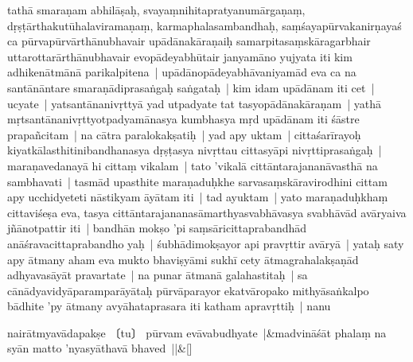 \documentclass[article,a4paper]{memoir}
\begin{document}
	  \pstart tathā\- smaraṇam abhilā\-ṣaḥ, svayaṃnihitapratyanumā\-rgaṇaṃ, dṛṣṭā\-rthakutū\-halaviramaṇaṃ, karmaphalasambandhaḥ, saṃśayapū\-rvakanirṇayaś ca pū\-rvapū\-rvā\-rthā\-nubhavair upā\-dā\-nakā\-raṇaiḥ samarpitasaṃskā\-ragarbhair uttarottarā\-rthā\-nubhavair evopā\-deyabhū\-tair janyamā\-no yujyata iti kim adhikenā\-tmā\-nā\- parikalpitena | \label{thakur75-127.13} upā\-dā\-nopā\-deyabhā\-vaniyamā\-d eva ca na santā\-nā\-ntare smaraṇā\-diprasaṅgaḥ saṅgataḥ | kim idam upā\-dā\-nam iti cet | \label{thakur75-127.14} ucyate | yatsantā\-nanivṛttyā\- yad utpadyate tat tasyopā\-dā\-nakā\-raṇam | yathā\- mṛtsantā\-nanivṛttyotpadyamā\-nasya kumbhasya mṛd upā\-dā\-nam iti śā\-stre prapañcitam | na cā\-tra paralokakṣatiḥ | \label{thakur75-127.17} yad apy uktam | cittaśarī\-rayoḥ kiyatkā\-lasthitinibandhanasya dṛṣṭasya nivṛttau cittasyā\-pi nivṛttiprasaṅgaḥ | maraṇavedanayā\- hi cittaṃ vikalam | tato 'vikalā\- cittā\-ntarajananā\-vasthā\- na sambhavati | tasmā\-d upasthite maraṇaduḥkhe sarvasaṃskā\-ravirodhini cittam apy ucchidyeteti nā\-stikyam ā\-yā\-tam iti | \label{thakur75-127.20} tad ayuktam | yato maraṇaduḥkhaṃ cittaviśeṣa eva, tasya cittā\-ntarajananasā\-marthyasvabhā\-vasya svabhā\-vā\-d avā\-ryaiva jñā\-notpattir iti | \label{thakur75-127.22} bandhā\-n mokṣo 'pi saṃsā\-ricittaprabandhā\-d anā\-śravacittaprabandho yaḥ | \label{thakur75-127.23} śubhā\-dimokṣayor api pravṛttir avā\-ryā\- | yataḥ saty apy ā\-tmany aham eva mukto bhaviṣyā\-mi sukhī\- cety ā\-tmagrahalakṣaṇā\-d adhyavasā\-yā\-t pravartate | na punar ā\-tmanā\- galahastitaḥ | sa cā\-nā\-dyavidyā\-paramparā\-yā\-taḥ pū\-rvā\-parayor ekatvā\-ropako mithyā\-saṅkalpo bā\-dhite 'py ā\-tmany avyā\-hataprasara iti katham apravṛttiḥ | \label{thakur75-127.26} nanu
	\pend
      
	    
	    \stanza[\smallbreak]
nairā\-tmyavā\-dapakṣe 〔tu〕 pū\-rvam evā\-vabudhyate |&madvinā\-śā\-t phalaṃ na syā\-n matto 'nyasyā\-thavā\- bhaved ||\&[\smallbreak]


	
\end{document}
